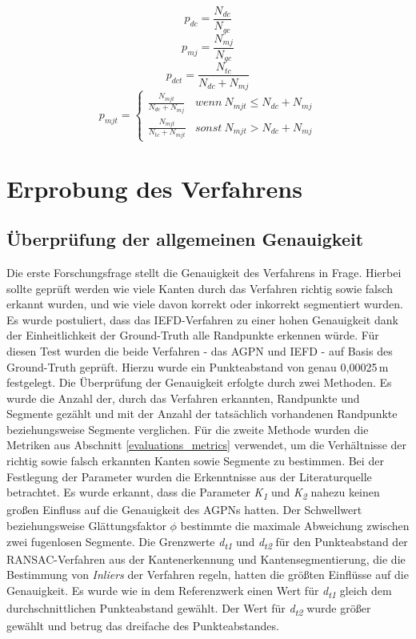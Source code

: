 \begin{equation}
	\label{pdc}
	p_{dc} = \frac{N_{dc}}{N_{gc}}
\end{equation}
\begin{equation}
	\label{pmj}
	p_{mj} = \frac{N_{mj}}{N_{gc}}
\end{equation}
\begin{equation}
	\label{pdct}
	p_{dct} = \frac{N_{tc}}{N_{dc} + N_{mj}}
\end{equation}
\begin{equation}
	\label{pmjt}
	p_{mjt} =
	\begin{cases}
		\frac{N_{mjt}}{N_{dc} + N_{mj}} & wenn\ N_{mjt} \leq N_{dc} + N_{mj}\\
		\frac{N_{mjt}}{N_{tc} + N_{mjt}} & sonst\ N_{mjt} > N_{dc} + N_{mj}
	\end{cases}
\end{equation}

\section{Erprobung des Verfahrens}
\subsection{Überprüfung der allgemeinen Genauigkeit} \label{test_1}
Die erste Forschungsfrage stellt die Genauigkeit des Verfahrens in Frage. Hierbei sollte geprüft werden wie viele Kanten durch das Verfahren richtig sowie falsch erkannt wurden, und wie viele davon korrekt oder inkorrekt segmentiert wurden. Es wurde postuliert, dass das IEFD-Verfahren zu einer hohen Genauigkeit dank der Einheitlichkeit der Ground-Truth alle Randpunkte erkennen würde. Für diesen Test wurden die beide Verfahren - das AGPN und IEFD - auf Basis des Ground-Truth geprüft. Hierzu wurde ein Punkteabstand von genau 0,00025\,\si{\metre} festgelegt. Die Überprüfung der Genauigkeit erfolgte durch zwei Methoden. Es wurde die Anzahl der, durch das Verfahren erkannten, Randpunkte und Segmente gezählt und mit der Anzahl der tatsächlich vorhandenen Randpunkte beziehungsweise Segmente verglichen. Für die zweite Methode wurden die Metriken aus Abschnitt \ref{evaluations_metrics} verwendet, um die Verhältnisse der richtig sowie falsch erkannten Kanten sowie Segmente zu bestimmen. Bei der Festlegung der Parameter wurden die Erkenntnisse aus der Literaturquelle betrachtet. Es wurde erkannt, dass die Parameter \textit{K\textsubscript{1}} und \textit{K\textsubscript{2}} nahezu keinen großen Einfluss auf die Genauigkeit des AGPNs hatten. Der Schwellwert beziehungsweise Glättungsfaktor $\phi$ bestimmte die maximale Abweichung zwischen zwei fugenlosen Segmente. Die Grenzwerte \textit{d\textsubscript{t1}} und \textit{d\textsubscript{t2}} für den Punkteabstand der RANSAC-Verfahren aus der Kantenerkennung und Kantensegmentierung, die die Bestimmung von \textit{Inliers} der Verfahren regeln, hatten die größten Einflüsse auf die Genauigkeit. Es wurde wie in dem Referenzwerk einen Wert für \textit{d\textsubscript{t1}} gleich dem durchschnittlichen Punkteabstand gewählt. Der Wert für \textit{d\textsubscript{t2}} wurde größer gewählt und betrug das dreifache des Punkteabstandes. \autocite[10-11]{ni_edge_2016}

